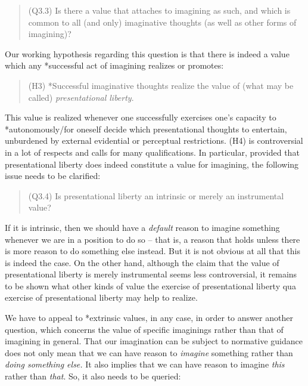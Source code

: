 \vspace{-.2cm}
\begin{quote}
(Q3.3) Is there a value that attaches to imagining as such, and which is common to all (and only) imaginative thoughts (as well as other forms of imagining)?
\end{quote}
\vspace{-.2cm}


\noindent Our working hypothesis regarding this question is that there is indeed a value which any *successful act of imagining realizes or promotes:

\vspace{-.2cm}
\begin{quote}
(H3) *Successful imaginative thoughts realize the value of (what may be called) \emph{presentational liberty}.
\end{quote}
\vspace{-.2cm}

\noindent This value is realized whenever one successfully exercises one's capacity to *autonomously/for oneself decide which presentational thoughts to entertain, unburdened by external evidential or perceptual restrictions. (H4) is controversial in a lot of respects and calls for many qualifications. In particular, provided that presentational liberty does indeed constitute a value for imagining, the following issue needs to be clarified:

\vspace{-.2cm}
\begin{quote}
(Q3.4) Is presentational liberty an intrinsic or merely an instrumental value?
\end{quote}
\vspace{-.2cm}

\noindent If it is intrinsic, then we should have a \emph{default} reason to imagine something whenever we are in a position to do so -- that is, a reason that holds unless there is more reason to do something else instead. But it is not obvious at all that this is indeed the case. On the other hand, although the claim that the value of presentational liberty is merely instrumental seems less controversial, it remains to be shown what other kinds of value the exercise of presentational liberty qua exercise of presentational liberty may help to realize.


We have to appeal to *extrinsic values, in any case, in order to answer another question, which concerns the value of specific imaginings rather than that of imagining in general. That our imagination can be subject to normative guidance does not only mean that we can have reason to \emph{imagine} something rather than \emph{doing something else.} It also implies that we can have reason to imagine \emph{this} rather than \emph{that}. So, it also needs to be queried:

